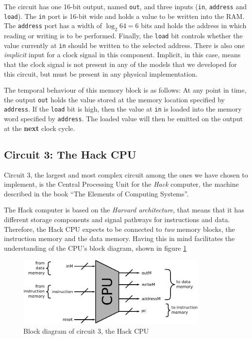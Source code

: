         The circuit has one 16-bit output, named \texttt{out}, and three inputs (\texttt{in},
        \texttt{address} and \texttt{load}). The \texttt{in} port is 16-bit wide and holds a value
        to be written into the RAM. The \texttt{address} port has a width of $\log_{2} 64 = 6$ bits
        and holds the address in which reading or writing is to be performed. Finally, the
        \texttt{load} bit controls whether the value currently at \texttt{in} should be written to
        the selected address. There is also one \emph{implicit} input for a clock signal in this
        component.  Implicit, in this case, means that the clock signal is not present in any of the
        models that we developed for this circuit, but must be present in any physical
        implementation.

        The temporal behaviour of this memory block is as follows: At any point in time, the output
        \texttt{out} holds the value stored at the memory location specified by \texttt{address}.
        If the \texttt{load} bit is high, then the value at \texttt{in} is loaded into the memory
        word specified by \texttt{address}. The loaded value will then be emitted on the output at
        the \textbf{next} clock cycle.

    \subsection{Circuit 3: The Hack CPU}
    \label{subsec:hack-cpu-circuit}

        Circuit 3, the largest and most complex circuit among the ones we have chosen to implement,
        is the Central Processing Unit for the \emph{Hack} computer, the machine described in the
        book ``The Elements of Computing Systems''\cite{nand2tetris-book}.

        The Hack computer is based on the \emph{Harvard architecture}, that means that it has
        different storage components and signal pathways for instructions and data. Therefore, the
        Hack CPU expects to be connected to \emph{two} memory blocks, the instruction memory and the
        data memory. Having this in mind facilitates the understanding of the CPU's block diagram,
        shown in figure \ref{fig:cpu-block}

        \begin{figure}[H]
            \centerline{\includegraphics[width=0.85\textwidth]{imgs/cpu-block.pdf}}
            \caption{Block diagram of circuit 3, the Hack CPU
                \label{fig:cpu-block}}
        \end{figure}

